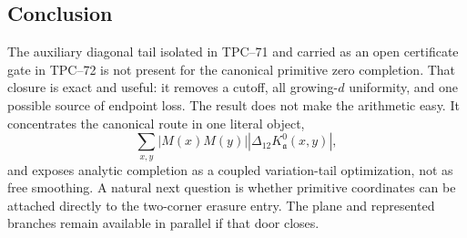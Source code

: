 \subsection{Conclusion}

The auxiliary diagonal tail isolated in TPC--71 and carried as an open
certificate gate in TPC--72 is not present for the canonical primitive
zero completion.
That closure is exact and useful: it removes a cutoff, all growing-\(d\)
uniformity, and one possible source of endpoint loss.  The result does not
make the arithmetic easy.  It concentrates the canonical route in one
literal object,
\[
 \sum_{x,y}|M(x)M(y)|
 |\Delta_{12}K_{\mathfrak a}^{0}(x,y)|,
\]
and exposes analytic completion as a coupled variation-tail optimization,
not as free smoothing.  A natural next question is whether primitive
coordinates can be attached directly to the two-corner erasure entry.
The plane and represented branches remain available in parallel if that
door closes.
